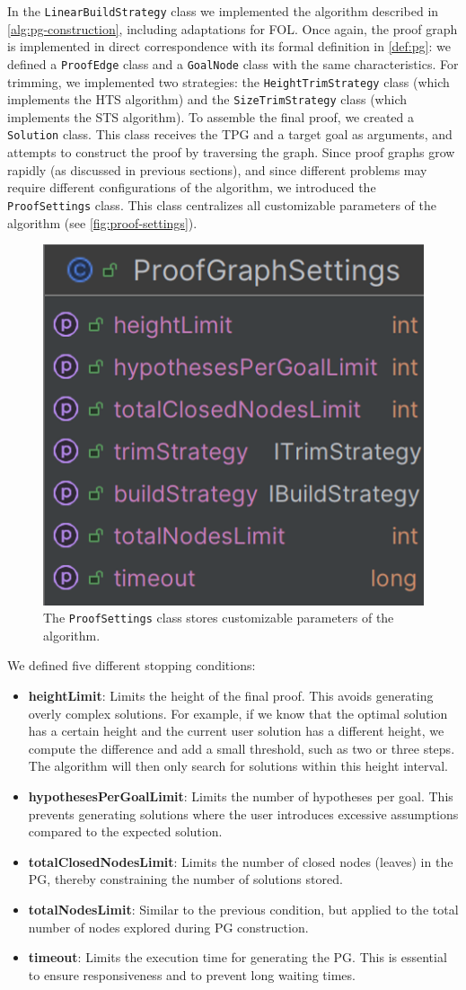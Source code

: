 In the \texttt{LinearBuildStrategy} class we implemented the algorithm described in \autoref{alg:pg-construction}, including adaptations for \gls{FOL}. Once again, the proof graph is implemented in direct correspondence with its formal definition in \autoref{def:pg}: we defined a \texttt{ProofEdge} class and a \texttt{GoalNode} class with the same characteristics.
For trimming, we implemented two strategies: the \texttt{HeightTrimStrategy} class (which implements the \gls{HTS} algorithm) and the \texttt{SizeTrimStrategy} class (which implements the \gls{STS} algorithm).
To assemble the final proof, we created a \texttt{Solution} class. This class receives the \gls{TPG} and a target goal as arguments, and attempts to construct the proof by traversing the graph. 
Since proof graphs grow rapidly (as discussed in previous sections), and since different problems may require different configurations of the algorithm, we introduced the \texttt{ProofSettings} class. This class centralizes all customizable parameters of the algorithm (see \autoref{fig:proof-settings}).

\begin{figure}
    \centering
    \includegraphics[width=0.3\linewidth]{Chapters/Figures/settings.png}
    \caption{The \texttt{ProofSettings} class stores customizable parameters of the algorithm.}
    \label{fig:proof-settings}
\end{figure}

We defined five different stopping conditions:
\begin{itemize}
    \item \textbf{heightLimit}: Limits the height of the final proof. This avoids generating overly complex solutions. For example, if we know that the optimal solution has a certain height and the current user solution has a different height, we compute the difference and add a small threshold, such as two or three steps. The algorithm will then only search for solutions within this height interval.
    \item \textbf{hypothesesPerGoalLimit}: Limits the number of hypotheses per goal. This prevents generating solutions where the user introduces excessive assumptions compared to the expected solution.
    \item \textbf{totalClosedNodesLimit}: Limits the number of closed nodes (leaves) in the \gls{PG}, thereby constraining the number of solutions stored.
    \item \textbf{totalNodesLimit}: Similar to the previous condition, but applied to the total number of nodes explored during \gls{PG} construction.
    \item \textbf{timeout}: Limits the execution time for generating the \gls{PG}. This is essential to ensure responsiveness and to prevent long waiting times.
\end{itemize}

